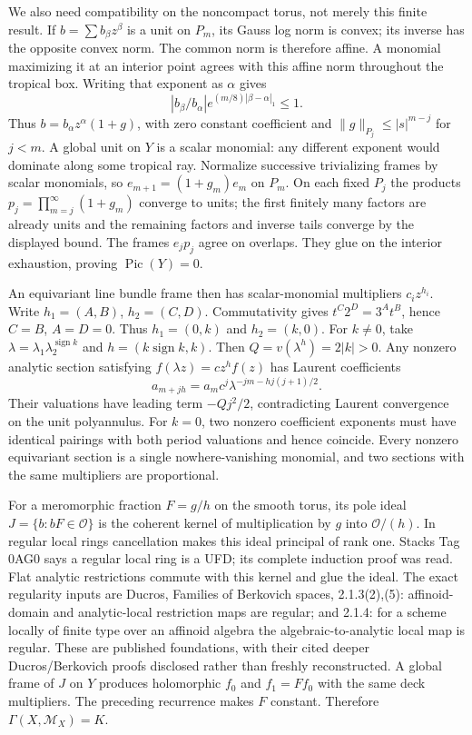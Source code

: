 \documentclass[11pt]{article}
\begin{document}
We also need compatibility on the noncompact torus, not merely this finite result. If $b=\sum b_\beta z^\beta$ is a unit on $P_m$, its Gauss log norm is convex; its inverse has the opposite convex norm. The common norm is therefore affine. A monomial maximizing it at an interior point agrees with this affine norm throughout the tropical box. Writing that exponent as $\alpha$ gives
\[
 |b_\beta/b_\alpha|e^{(m/8)|\beta-\alpha|_1}\le1.
\]
Thus $b=b_\alpha z^\alpha(1+g)$, with zero constant coefficient and $\|g\|_{P_j}\le |s|^{m-j}$ for $j<m$. A global unit on $Y$ is a scalar monomial: any different exponent would dominate along some tropical ray. Normalize successive trivializing frames by scalar monomials, so $e_{m+1}=(1+g_m)e_m$ on $P_m$. On each fixed $P_j$ the products $p_j=\prod_{m=j}^{\infty}(1+g_m)$ converge to units; the first finitely many factors are already units and the remaining factors and inverse tails converge by the displayed bound. The frames $e_jp_j$ agree on overlaps. They glue on the interior exhaustion, proving $\operatorname{Pic}(Y)=0$.

An equivariant line bundle frame then has scalar-monomial multipliers $c_i z^{h_i}$. Write $h_1=(A,B)$, $h_2=(C,D)$. Commutativity gives $t^C2^D=3^At^B$, hence $C=B$, $A=D=0$. Thus $h_1=(0,k)$ and $h_2=(k,0)$. For $k\ne0$, take $\lambda=\lambda_1\lambda_2^{\operatorname{sign}k}$ and $h=(k\operatorname{sign}k,k)$. Then $Q=v(\lambda^h)=2|k|>0$. Any nonzero analytic section satisfying $f(\lambda z)=cz^h f(z)$ has Laurent coefficients
\[
 a_{m+jh}=a_m c^j\lambda^{-jm-hj(j+1)/2}.
\]
Their valuations have leading term $-Qj^2/2$, contradicting Laurent convergence on the unit polyannulus. For $k=0$, two nonzero coefficient exponents must have identical pairings with both period valuations and hence coincide. Every nonzero equivariant section is a single nowhere-vanishing monomial, and two sections with the same multipliers are proportional.

For a meromorphic fraction $F=g/h$ on the smooth torus, its pole ideal $J=\{b:bF\in\mathcal O\}$ is the coherent kernel of multiplication by $g$ into $\mathcal O/(h)$. In regular local rings cancellation makes this ideal principal of rank one. Stacks Tag 0AG0 says a regular local ring is a UFD; its complete induction proof was read. Flat analytic restrictions commute with this kernel and glue the ideal. The exact regularity inputs are Ducros, Families of Berkovich spaces, 2.1.3(2),(5): affinoid-domain and analytic-local restriction maps are regular; and 2.1.4: for a scheme locally of finite type over an affinoid algebra the algebraic-to-analytic local map is regular. These are published foundations, with their cited deeper Ducros/Berkovich proofs disclosed rather than freshly reconstructed. A global frame of $J$ on $Y$ produces holomorphic $f_0$ and $f_1=Ff_0$ with the same deck multipliers. The preceding recurrence makes $F$ constant. Therefore $\Gamma(X,\mathcal M_X)=K$.
\end{document}
